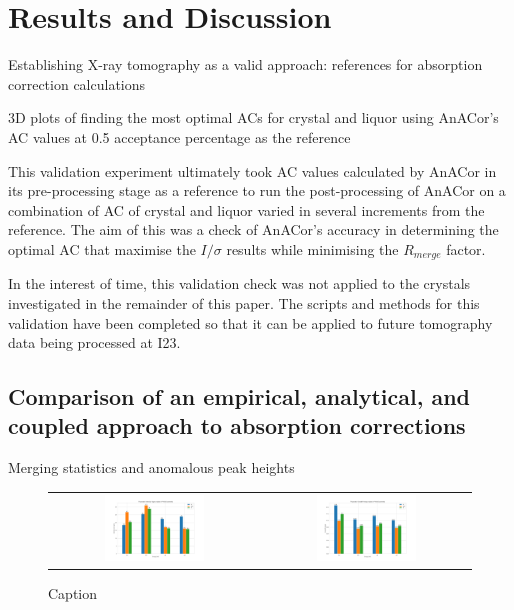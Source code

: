 \section{Results and Discussion}



Establishing X-ray tomography as a valid approach: references for absorption correction calculations

3D plots of finding the most optimal ACs for crystal and liquor using AnACor's AC values at 0.5 acceptance percentage as the reference

This validation experiment ultimately took AC values calculated by AnACor in its pre-processing stage as a reference to run the post-processing of AnACor on a combination of AC of crystal and liquor varied in several increments from the reference. The aim of this was a check of AnACor's accuracy in determining the optimal AC that maximise the $I/ \sigma$ results while minimising the $R_{merge}$ factor.

In the interest of time, this validation check was not applied to the crystals investigated in the remainder of this paper. The scripts and methods for this validation have been completed so that it can be applied to future tomography data being processed at I23.

 

\subsection{Comparison of an empirical, analytical, and coupled approach to absorption corrections}

Merging statistics and anomalous peak heights \cite{LuSubmitted}

\begin{figure}[h]
    \centering
    \begin{tabular}{cc}
    \includegraphics[width = 0.5\textwidth]{plots/Experiment 1/thaum_1/I_over_sigma.png} & \includegraphics[width = 0.5\textwidth]{plots/Experiment 1/thaum_1/rmerges.png}
    \end{tabular}
    \caption{Caption}
    \label{fig:thaum1_Isig}
\end{figure}

